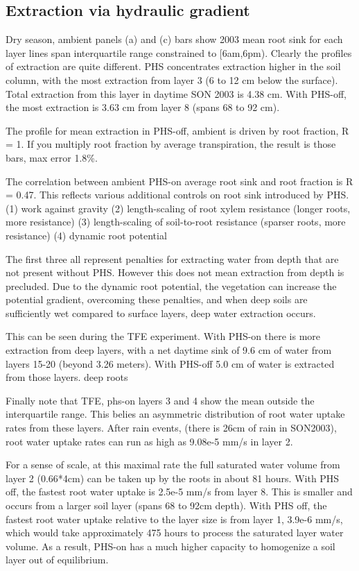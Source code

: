 \documentclass[draft,linenumbers]{agujournal}
\begin{document}
\subsection{Extraction via hydraulic gradient}

Dry season, ambient panels (a) and (c)
bars show 2003 mean root sink for each layer
lines span interquartile range
constrained to [6am,6pm).
Clearly the profiles of extraction are quite different.
PHS concentrates extraction higher in the soil column, with the most extraction from layer 3 (6 to 12 cm below the surface).
Total extraction from this layer in daytime SON 2003 is 4.38 cm.
With PHS-off, the most extraction is 3.63 cm from layer 8 (spans 68 to 92 cm).

The profile for mean extraction in PHS-off, ambient is driven by root fraction, R = 1.
If you multiply root fraction by average transpiration, the result is those bars, max error 1.8\%.

The correlation between ambient PHS-on average root sink and root fraction is R = 0.47.
This reflects various additional controls on root sink introduced by PHS.
(1) work against gravity
(2) length-scaling of root xylem resistance (longer roots, more resistance)
(3) length-scaling of soil-to-root resistance (sparser roots, more resistance)
(4) dynamic root potential

The first three all represent penalties for extracting water from depth that are not present without PHS.
However this does not mean extraction from depth is precluded.
Due to the dynamic root potential, the vegetation can increase the potential gradient, overcoming these penalties,  
and when deep soils are sufficiently wet compared to surface layers, deep water extraction occurs.

This can be seen during the TFE experiment. With PHS-on there is more extraction from deep layers, 
with a net daytime sink of 9.6 cm of water from layers 15-20 (beyond 3.26 meters). 
With PHS-off  5.0 cm of water is extracted from those layers.
deep roots \citep{nepstad1994}

Finally note that TFE, phs-on layers 3 and 4 show the mean outside the interquartile range. 
This belies an asymmetric distribution of root water uptake rates from these layers.
After rain events, (there is 26cm of rain in SON2003), root water uptake rates can run as high as 9.08e-5 mm/s in layer 2.

For a sense of scale, at this maximal rate the full saturated water volume from layer 2 (0.66*4cm) can be taken up by the roots in about 81 hours.
With PHS off, the fastest root water uptake is 2.5e-5 mm/s from layer 8. This is smaller and occurs from a larger soil layer (spans 68 to 92cm depth).
With PHS off, the fastest root water uptake relative to the layer size is from layer 1, 3.9e-6 mm/s, 
which would take approximately 475 hours to process the saturated layer water volume. 
As a result, PHS-on has a much higher capacity to homogenize a soil layer out of equilibrium. 
\end{document}
